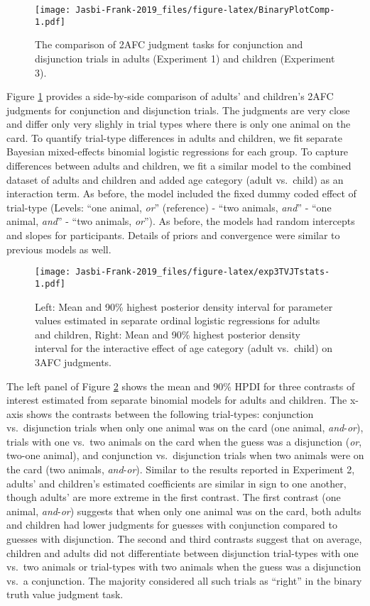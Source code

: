 \documentclass[,man,floatsintext]{apa6}
\begin{document}
\begin{figure}
\centering
\texttt{[image: Jasbi-Frank-2019\_files/figure-latex/BinaryPlotComp-1.pdf]}
\caption{\label{fig:BinaryPlotComp}The comparison of 2AFC judgment tasks for conjunction and disjunction trials in adults (Experiment 1) and children (Experiment 3).}
\end{figure}

Figure \ref{fig:BinaryPlotComp} provides a side-by-side comparison of adults' and children's 2AFC judgments for conjunction and disjunction trials. The judgments are very close and differ only very slighly in trial types where there is only one animal on the card. To quantify trial-type differences in adults and children, we fit separate Bayesian mixed-effects binomial logistic regressions for each group. To capture differences between adults and children, we fit a similar model to the combined dataset of adults and children and added age category (adult vs.~child) as an interaction term. As before, the model included the fixed dummy coded effect of trial-type (Levels: \enquote{one animal, \emph{or}} (reference) - \enquote{two animals, \emph{and}} - \enquote{one animal, \emph{and}} - \enquote{two animals, \emph{or}}). As before, the models had random intercepts and slopes for participants. Details of priors and convergence were similar to previous models as well.

\begin{figure}
\centering
\texttt{[image: Jasbi-Frank-2019\_files/figure-latex/exp3TVJTstats-1.pdf]}
\caption{\label{fig:exp3TVJTstats}Left: Mean and 90\% highest posterior density interval for parameter values estimated in separate ordinal logistic regressions for adults and children, Right: Mean and 90\% highest posterior density interval for the interactive effect of age category (adult vs.~child) on 3AFC judgments.}
\end{figure}

The left panel of Figure \ref{fig:exp3TVJTstats} shows the mean and 90\% HPDI for three contrasts of interest estimated from separate binomial models for adults and children. The x-axis shows the contrasts between the following trial-types: conjunction vs.~disjunction trials when only one animal was on the card (one animal, \emph{and}-\emph{or}), trials with one vs.~two animals on the card when the guess was a disjunction (\emph{or}, two-one animal), and conjunction vs.~disjunction trials when two animals were on the card (two animals, \emph{and}-\emph{or}). Similar to the results reported in Experiment 2, adults' and children's estimated coefficients are similar in sign to one another, though adults' are more extreme in the first contrast. The first contrast (one animal, \emph{and}-\emph{or}) suggests that when only one animal was on the card, both adults and children had lower judgments for guesses with conjunction compared to guesses with disjunction. The second and third contrasts suggest that on average, children and adults did not differentiate between disjunction trial-types with one vs.~two animals or trial-types with two animals when the guess was a disjunction vs.~a conjunction. The majority considered all such trials as \enquote{right} in the binary truth value judgment task.
\end{document}
